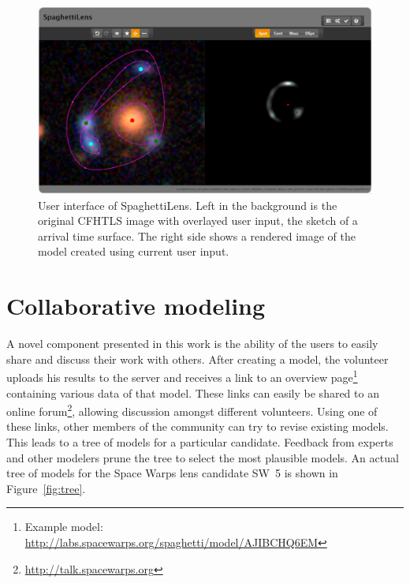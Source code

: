 \documentclass{ws-procs975x65}
\newcommand{\spl}{SpaghettiLens\xspace}
\newcommand{\sw}{Space Warps\xspace}
\newcommand{\SW}[1]{SW~#1\xspace}
\newcommand{\figref}[1]{Figure~\ref{fig:#1}}
\begin{document}
\begin{figure}
  \centering
  \includegraphics[width=\columnwidth]{screenshot_new}
  \caption{
    User interface of \spl. Left in the background is the original CFHTLS image with overlayed user input, the sketch of a arrival time surface. The right side shows a rendered image of the model created using current user input.
  }
  \label{fig:ui}
\end{figure}


\section{Collaborative modeling}

A novel component presented in this work is the ability of the users to easily share and discuss their work with others.
After creating a model, the volunteer uploads his results to the server and receives a link to an overview page\footnote{Example model: \url{http://labs.spacewarps.org/spaghetti/model/AJIBCHQ6EM}} containing various data of that model.
These links can easily be shared to an online forum\footnote{\url{http://talk.spacewarps.org}}, allowing discussion amongst different volunteers.
Using one of these links, other members of the community can try to revise existing models.
This leads to a tree of models for a particular candidate.
Feedback from experts and other modelers prune the tree to select the most plausible models.
An actual tree of models for the \sw lens candidate \SW{5} is shown in \figref{tree}.
\end{document}
